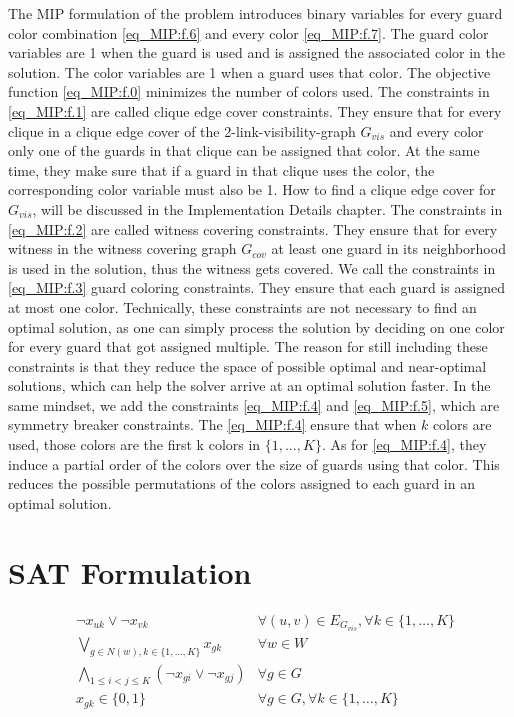 The MIP formulation of the problem introduces binary variables for every guard color combination \cref{eq_MIP:f.6} and every color \cref{eq_MIP:f.7}. The guard color variables are 1 when the guard is used and is assigned the associated color in the solution. The color variables are 1 when a guard uses that color. The objective function \cref{eq_MIP:f.0} minimizes the number of colors used. The constraints in \cref{eq_MIP:f.1} are called clique edge cover constraints. They ensure that for every clique in a clique edge cover of the 2-link-visibility-graph $G_{vis}$ and every color only one of the guards in that clique can be assigned that color. At the same time, they make sure that if a guard in that clique uses the color, the corresponding color variable must also be 1. How to find a clique edge cover for $G_{vis}$, will be discussed in the Implementation Details chapter. The constraints in \cref{eq_MIP:f.2} are called witness covering constraints. They ensure that for every witness in the witness covering graph $G_{cov}$ at least one guard in its neighborhood is used in the solution, thus the witness gets covered. We call the constraints in \cref{eq_MIP:f.3} guard coloring constraints. They ensure that each guard is assigned at most one color. Technically, these constraints are not necessary to find an optimal solution, as one can simply process the solution by deciding on one color for every guard that got assigned multiple. The reason for still including these constraints is that they reduce the space of possible optimal and near-optimal solutions, which can help the solver arrive at an optimal solution faster. In the same mindset, we add the constraints \cref{eq_MIP:f.4} and \cref{eq_MIP:f.5}, which are symmetry breaker constraints. The \cref{eq_MIP:f.4} ensure that when $k$ colors are used, those colors are the first k colors in $\{1,\ldots,K\}$. As for \cref{eq_MIP:f.4}, they induce a partial order of the colors over the size of guards using that color. This reduces the possible permutations of the colors assigned to each guard in an optimal solution.

\section{SAT Formulation}

\begin{align}
\label{eq_SAT:f.0}&\lnot x_{uk} \lor \lnot x_{vk} & \forall (u,v)\in E_{G_{vis}}, \forall k\in \{1,\ldots,K\}\\
\label{eq_SAT:f.1}&\bigvee_{g\in N(w), k\in \{1,\ldots,K\}}x_{gk} & \forall w\in W\\
\label{eq_SAT:f.2}&\bigwedge_{1 \leq i < j \leq K} (\lnot x_{gi} \lor \lnot x_{gj}) & \forall g\in G\\
\label{eq_SAT:f.3}& x_{gk} \in \{0,1\} & \forall g\in G, \forall k\in \{1,\ldots,K\}
\end{align}

